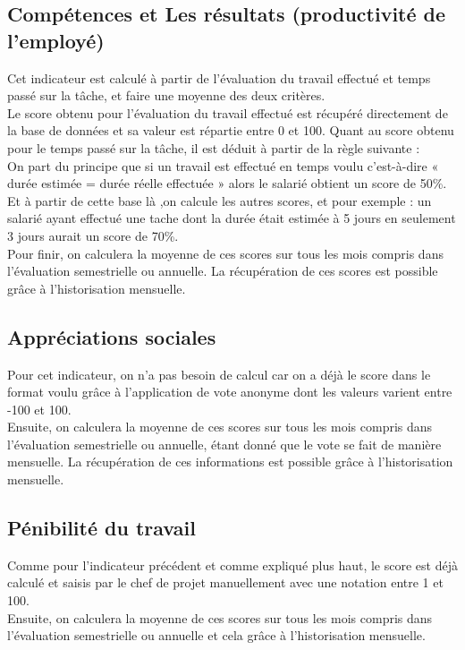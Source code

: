 \subsection{Compétences et Les résultats (productivité de l’employé)}
Cet indicateur est calculé à partir de l’évaluation du travail effectué et temps passé sur la tâche, et faire une moyenne des deux critères. \\
Le score obtenu pour l’évaluation du travail effectué est récupéré directement de la base de données et sa valeur est répartie entre 0 et 100. Quant au score obtenu pour le temps passé sur la tâche, il est déduit à partir de la règle suivante :\\

On part du principe que si un travail est effectué en temps voulu c’est-à-dire « durée estimée = durée réelle effectuée » alors le salarié obtient un score de 50\%. Et à partir de cette base là ,on calcule les autres scores, et pour exemple : un salarié ayant effectué une tache dont la durée était estimée à 5 jours en seulement  3 jours  aurait un score de 70\%.\\

Pour finir, on calculera la moyenne de ces scores sur tous les mois compris dans l’évaluation semestrielle ou annuelle.  La récupération de ces scores est possible grâce à l’historisation mensuelle.  


\subsection{Appréciations sociales}
Pour cet indicateur, on n'a pas besoin de calcul car on a déjà le score dans le format voulu grâce à l’application de vote anonyme dont les valeurs varient entre -100 et 100.   \\
Ensuite, on calculera la moyenne de ces scores sur tous les mois compris dans l’évaluation semestrielle ou annuelle, étant donné que le vote se fait de manière mensuelle. La récupération de ces informations est possible grâce à l’historisation mensuelle.

\subsection{Pénibilité du travail}
Comme pour l’indicateur précédent et comme expliqué plus haut, le score est déjà calculé et saisis par le chef de projet manuellement avec une notation entre 1 et 100.\\
Ensuite, on calculera la moyenne de ces scores sur tous les mois compris dans l’évaluation semestrielle ou annuelle et cela grâce à l’historisation mensuelle. 


